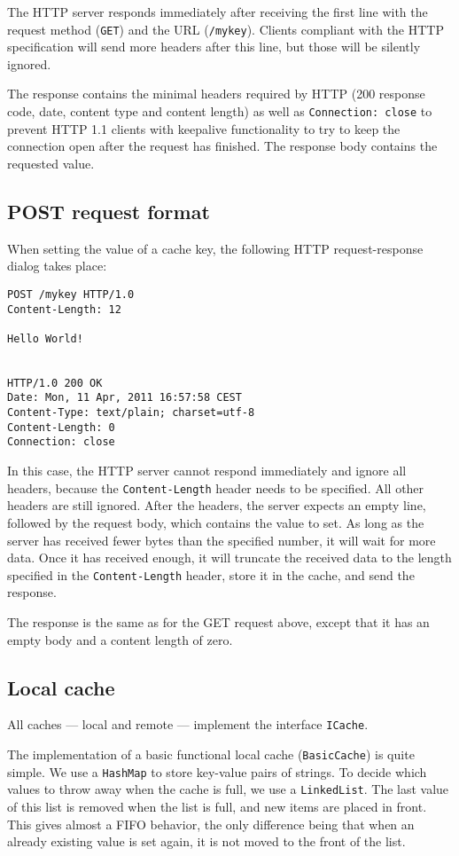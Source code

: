 \documentclass[11pt]{article}
\begin{document}
The HTTP server responds immediately after receiving the first line with the
request method (\lstinline!GET!) and the URL (\lstinline!/mykey!). Clients
compliant with the HTTP specification will send more headers after this line,
but those will be silently ignored.

The response contains the minimal headers required by HTTP (200 response code,
date, content type and content length) as well as \lstinline!Connection: close!
to prevent HTTP 1.1 clients with keepalive functionality to try to keep the
connection open after the request has finished. The response body contains
the requested value.

\subsection*{POST request format}
When setting the value of a cache key, the following HTTP request-response
dialog takes place:

\begin{lstlisting}
POST /mykey HTTP/1.0
Content-Length: 12

Hello World!


HTTP/1.0 200 OK
Date: Mon, 11 Apr, 2011 16:57:58 CEST
Content-Type: text/plain; charset=utf-8
Content-Length: 0
Connection: close
\end{lstlisting}

In this case, the HTTP server cannot respond immediately and ignore all headers,
because the \lstinline!Content-Length! header needs to be specified. All other
headers are still ignored. After the headers, the server expects an empty line,
followed by the request body, which contains the value to set. As long as the
server has received fewer bytes than the specified number, it will wait for
more data. Once it has received enough, it will truncate the received data
to the length specified in the \lstinline!Content-Length! header, store it
in the cache, and send the response.

The response is the same as for the GET request above, except that it has an
empty body and a content length of zero.

\subsection*{Local cache}
All caches --- local and remote --- implement the interface \texttt{ICache}.

The implementation of a basic functional local cache (\texttt{BasicCache}) is quite simple. We use a \texttt{HashMap} to store key-value pairs of strings. To decide which values to throw away when the cache is full, we use a \texttt{LinkedList}. The last value of this list is removed when the list is full, and new items are placed in front. This gives almost a FIFO behavior, the only difference being that when an already existing value is set again, it is not moved to the front of the list.
\end{document}
